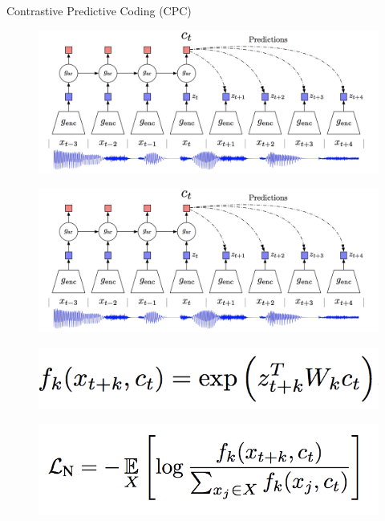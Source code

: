 \begin{frame}[allowframebreaks]{Contrastive Predictive Coding (CPC)}
    \framebreak

    \begin{figure}
        \centering
        \includegraphics[width=1\linewidth,height=0.9\textheight,keepaspectratio]{images/ssl/slide_49_1_img.png}
    \end{figure}

    \framebreak

    \begin{figure}
        \centering
        \includegraphics[width=1\linewidth,height=0.5\textheight,keepaspectratio]{images/ssl/slide_50_2_img.png}
    \end{figure}

    \begin{figure}
        \centering
        \includegraphics[width=0.5\linewidth,height=0.3\textheight,keepaspectratio]{images/ssl/slide_50_3_img.png}
    \end{figure}

    \begin{figure}
        \centering
        \includegraphics[width=0.5\linewidth,height=0.3\textheight,keepaspectratio]{images/ssl/slide_50_1_img.png}
    \end{figure}


\end{frame}
